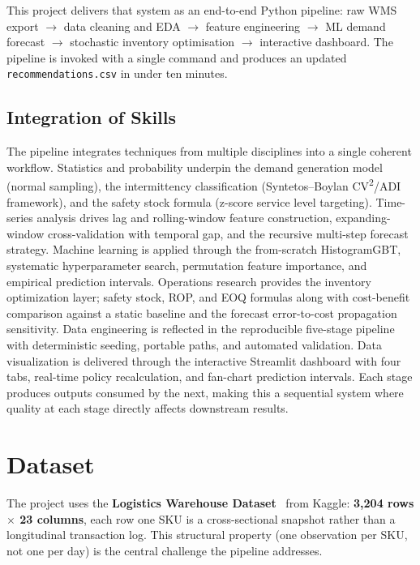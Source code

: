 \documentclass[11pt,letterpaper]{article}
\begin{document}
This project delivers that system as an end-to-end Python pipeline: raw WMS export $\rightarrow$ data cleaning and EDA $\rightarrow$ feature engineering $\rightarrow$ ML demand forecast $\rightarrow$ stochastic inventory optimisation $\rightarrow$ interactive dashboard. The pipeline is invoked with a single command and produces an updated \texttt{recommendations.csv} in under ten minutes.

\subsection{Integration of Skills}

The pipeline integrates techniques from multiple disciplines into a single coherent workflow. Statistics and probability underpin the demand generation model (normal sampling), the intermittency classification (Syntetos--Boylan CV\textsuperscript{2}/ADI framework), and the safety stock formula (z-score service level targeting). Time-series analysis drives lag and rolling-window feature construction, expanding-window cross-validation with temporal gap, and the recursive multi-step forecast strategy. Machine learning is applied through the from-scratch HistogramGBT, systematic hyperparameter search, permutation feature importance, and empirical prediction intervals. Operations research provides the inventory optimization layer; safety stock, ROP, and EOQ formulas along with cost-benefit comparison against a static baseline and the forecast error-to-cost propagation sensitivity. Data engineering is reflected in the reproducible five-stage pipeline with deterministic seeding, portable paths, and automated validation. Data visualization is delivered through the interactive Streamlit dashboard with four tabs, real-time policy recalculation, and fan-chart prediction intervals. Each stage produces outputs consumed by the next, making this a sequential system where quality at each stage directly affects downstream results.


\section{Dataset}
\label{sec:dataset}

The project uses the \textbf{Logistics Warehouse Dataset}~\cite{rehman2024logistics} from Kaggle: \textbf{3,204 rows $\times$ 23 columns}, each row one SKU is a cross-sectional snapshot rather than a longitudinal transaction log. This structural property (one observation per SKU, not one per day) is the central challenge the pipeline addresses.
\end{document}
